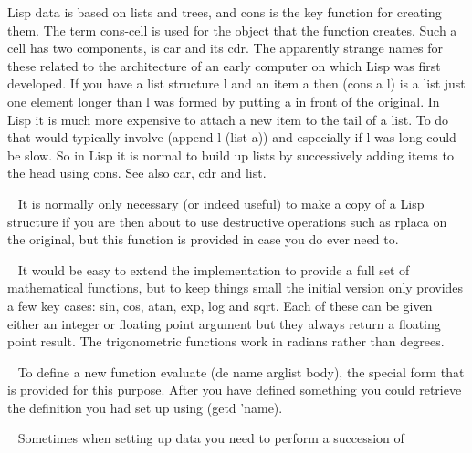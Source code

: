 \begin{description}
Lisp data is based on lists and trees, and {\tx cons} is the key function
for creating them. The term {\tx cons}-cell is used for the object that
the function creates. Such a cell has two components, is {\tx car} and
its {\tx cdr}. The apparently strange names for these related to the
architecture of an early computer on which Lisp was first developed.
If you have a list structure {\tx l} and an item {\tx a} then
{\tx (cons a l)} is a list just one element longer than {\tx l} was formed
by putting {\tx a} in front of the original. In Lisp it is much more
expensive to attach a new item to the tail of a list. To do that
would typically involve {\tx (append l (list a))} and especially if {\tx l}
was long could be slow. So in Lisp it is normal to build up lists by
successively adding items to the head using {\tx cons}. See also {\tx car},
{\tx cdr} and {\tx list}.
\item[{\tx copy~~~~~~~~~} \hspace{1cm} {\em function 1 arg}]~\newline
It is normally only necessary (or indeed useful) to make a copy of a Lisp
structure if you are then about to use destructive operations such as
{\tx rplaca} on the original, but this function is provided in case you
do ever need to.
\item[{\tx cos~~~~~~~~~~} \hspace{1cm} {\em function 1 arg}]~\newline
It would be easy to extend the \vsl{} implementation to provide a full set
of mathematical functions, but to keep things small the initial version only
provides a few key cases: {\tx sin}, {\tx cos}, {\tx atan},
{\tx exp}, {\tx log} and {\tx sqrt}. Each of these can be given
either an integer or floating point argument but they always return a floating
point result. The trigonometric functions work in radians rather than
degrees.
\item[{\tx de~~~~~~~~~~~} \hspace{1cm} {\em special form}]~\newline
To define a new function evaluate {\tx (de name arglist body)}, the special
form that is provided for this purpose. After you have defined something
you could retrieve the definition you had set up using {\tx (getd 'name)}.
\item[{\tx deflist~~~~~~} \hspace{1cm} {\em function 2 args}]~\newline
Sometimes when setting up data you need to perform a succession of

\end{description}
